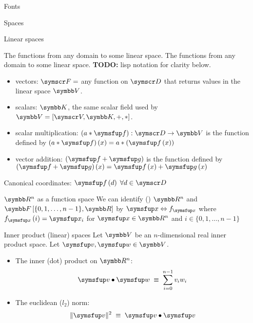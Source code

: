 \documentclass[12pt]{PalisadesLakesArticle}
\begin{document}
\begin{plSection}{Fonts}
\begin{plSection}{Spaces}
\begin{plSection}{Linear spaces}
\begin{plExample}{The functions from any domain to some linear space.}{}
The functions from any domain to some linear space.
\textbf{TODO:} lisp notation for clarity below.
\begin{itemize}
  \item vectors: $\Set{F} = $ any function on $\Set{D}$
  that returns values in the linear space $\Space{V}$.
  \item scalars: $\Space{K}$, the same scalar field used by
  $\Space{V}=\left[ \Set{V}, \Space{K}, +, * \right]$.
  \item scalar multiplication:
  $ \left(a*\Vector{f}\right) : \Set{D} \rightarrow \Space{V}$
  is the function defined by
   $ \left(a*\Vector{f}\right) (x)
   = a*\left(\Vector{f}\left( x \right) \right) $
  \item vector addition:
  $\left( \Vector{f} + \Vector{g} \right) $
  is the function defined by
  $\left( \Vector{f} + \Vector{g} \right) \left( x \right) =
  \Vector{f} \left( x \right) + \Vector{g} \left( x\right)$
\end{itemize}
Canonical coordinates: 
$\Vector{f}\left( d \right) \; \forall d \in \Set{D}$
\end{plExample}

\begin{plExample}{{ $\Space{R}^n$ as a function space }}{}
We can identify 
() 
$\Space{R}^n$ and 
$ \Space{F} \left[ \{ 0, 1, \ldots, {n-1} \}, \Space{R} \right] $
by
$\Vector{x} \Leftrightarrow f_{\Vector{x}}$
where $f_{\Vector{x}} \left( i \right) = \Vector{x}_i$
for $\Vector{x} \in \Space{R}^n$ and 
$i \in \{ 0, 1, \ldots, {n-1} \}$
\end{plExample}

\begin{plSection}{Inner product (linear) spaces}
Let $\Space{V}$ be an $n$-dimensional real inner product space.
Let $\Vector{v}, \Vector{w} \in \Space{V}$.

\begin{itemize}
\item The inner (dot) product on $\Reals^n$:
\begin{equation}
\Vector{v} \bullet \Vector{w} \; \equiv \; \sum_{i=0}^{n-1} v_i w_i
\end{equation}

\item The euclidean ($l_2$) norm:
\begin{equation}
\| \Vector{v} \|^2 \; \equiv \; \Vector{v} \bullet \Vector{v}
\end{equation}


\end{itemize}
\end{plSection}
\end{plSection}
\end{plSection}
\end{plSection}
\end{document}
